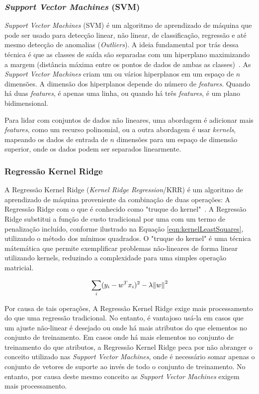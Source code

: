 \documentclass[portugues]{ic-tese}
\begin{document}
\subsubsection{\textit{Support Vector Machines} (SVM)}

\textit{Support Vector Machines} (SVM) é um algoritmo de aprendizado de máquina que pode ser usado para detecção linear, não linear, de classificação, regressão e até mesmo detecção de anomalias (\textit{Outliers}). A ideia fundamental por trás dessa técnica é que as classes de saída são separadas com um hiperplano maximizando a margem (distância máxima entre os pontos de dados de ambas as classes)~\citep{Steinwart_2008}. As \textit{Support Vector Machines} criam um ou vários hiperplanos em um espaço de $n$ dimensões. A dimensão dos hiperplanos depende do número de \textit{features}. Quando há duas \textit{features}, é apenas uma linha, ou quando há três \textit{features}, é um plano bidimensional.

Para lidar com conjuntos de dados não lineares, uma abordagem é adicionar mais \textit{features}, como um recurso polinomial, ou a outra abordagem é usar \textit{kernels}, mapeando os dados de entrada de $n$ dimensões para um espaço de dimensão superior, onde os dados podem ser separados linearmente.

\subsubsection{Regressão Kernel Ridge}

A Regressão Kernel Ridge (\textit{Kernel Ridge Regression}/KRR) é um algoritmo de aprendizado de máquina proveniente da combinação de duas operações: A Regressão Ridge com o que é conhecido como "truque do kernel"~\citep{Witten_2016}. A Regressão Ridge substitui a função de custo tradicional por uma com um termo de penalização incluído, conforme ilustrado na Equação \ref{eqn:kernelLeastSquares}, utilizando o método dos mínimos quadrados. O "truque do kernel" é uma técnica mátemática que permite exemplificar problemas não-lineares de forma linear utilizando kernels, reduzindo a complexidade para uma simples operação matricial.

\begin{equation}
\label{eqn:kernelLeastSquares}
\sum_{i} (y_{i} - w^{T}x_i)^{2} - \lambda \norm{w}^{2}
\end{equation}

Por causa de tais operações, A Regressão Kernel Ridge exige mais processamento do que uma regressão tradicional. No entanto, é vantajoso usá-la em casos que um ajuste não-linear é desejado ou onde há mais atributos do que elementos no conjunto de treinamento. Em casos onde há mais elementos no conjunto de treinamento do que atributos, a Regressão Kernel Ridge peca por não abranger o conceito utilizado nas \textit{Support Vector Machines}, onde é necessário somar apenas o conjunto de vetores de suporte ao invés de todo o conjunto de treinamento. No entanto, por causa deste mesmo conceito as \textit{Support Vector Machines} exigem mais processamento.
\end{document}
